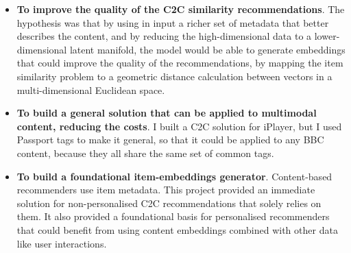 \begin{itemize}
  \item \textbf{To improve the quality of the C2C similarity recommendations}. The hypothesis was that by using in input a richer set of metadata that
  better describes the content, and by reducing the high-dimensional data to a lower-dimensional latent manifold,
  the model would be able to generate embeddings that could improve the quality of the recommendations, by mapping the
  item similarity problem to a geometric distance calculation between vectors in a multi-dimensional Euclidean space.
  \item \textbf{To build a general solution that can be applied to multimodal content, reducing the costs}. I built a C2C solution for
  iPlayer, but I used Passport tags to make it general, so that it could be applied to any BBC content, because they all share the same set of common tags.
  \item \textbf{To build a foundational item-embeddings generator}. Content-based recommenders
  use item metadata. This project provided an immediate solution for non-personalised C2C recommendations that solely relies on them.
  It also provided a foundational basis for personalised recommenders that could benefit from using content embeddings combined with other data like user interactions.
\end{itemize}
